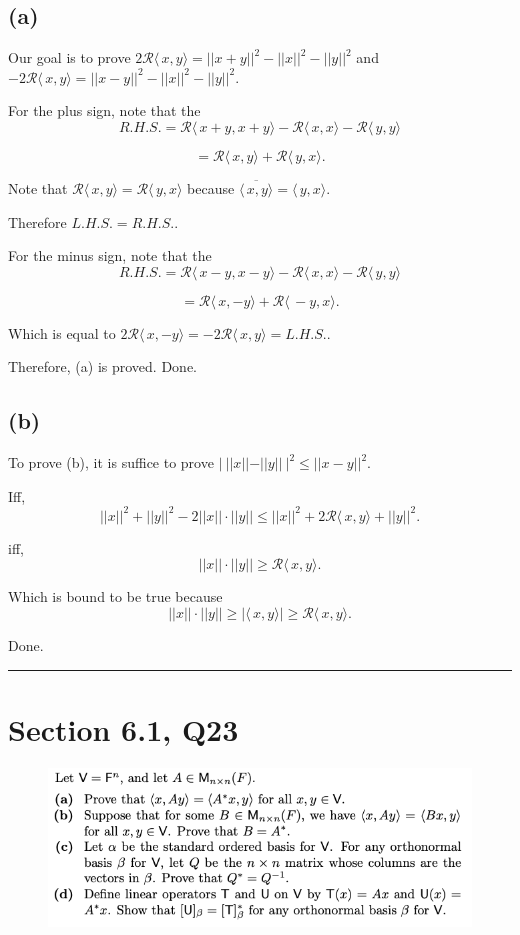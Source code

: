 \documentclass[12pt]{article}%
\begin{document}
\subsection{(a)}
Our goal is to prove $ 2\mathcal{R}\langle\,x,y\rangle=||x+ y||^2-||x||^2-||y||^2$ and $ -2\mathcal{R}\langle\,x,y\rangle=||x-y||^2-||x||^2-||y||^2.$

For the plus sign, note that the $$R.H.S.=\mathcal{R}\langle\,x + y,x + y\rangle-\mathcal{R}\langle\,x,x\rangle-\mathcal{R}\langle\,y,y\rangle$$

$$=\mathcal{R}\langle\,x,y\rangle+\mathcal{R}\langle\,y,x\rangle.$$

Note that $\mathcal{R}\langle\,x,y\rangle = \mathcal{R}\langle\,y,x\rangle$ because $\overline{\langle\,x,y\rangle}=\langle\,y,x\rangle.$

Therefore $L.H.S.=R.H.S..$

For the minus sign, note that the $$R.H.S.=\mathcal{R}\langle\,x - y,x - y\rangle-\mathcal{R}\langle\,x,x\rangle-\mathcal{R}\langle\,y,y\rangle$$

$$=\mathcal{R}\langle\,x,-y\rangle+\mathcal{R}\langle\,-y,x\rangle.$$ 

Which is equal to $2\mathcal{R}\langle\,x,-y\rangle=-2\mathcal{R}\langle\,x,y\rangle=L.H.S..$

Therefore, (a) is proved. Done.

\subsection{(b)}
To prove (b), it is suffice to prove $|~||x||-||y||~|^2\leq ||x-y||^2.$

Iff, $$||x||^2+||y||^2-2||x|| \cdot ||y||\leq ||x||^2 + 2\mathcal{R}\langle\,x,y\rangle+||y||^2.$$

iff, $$||x||\cdot ||y||\geq \mathcal{R}\langle\,x,y\rangle.$$

Which is bound to be true because $$||x||\cdot ||y||\geq |\langle\,x,y\rangle|\geq \mathcal{R}\langle\,x,y\rangle.$$

Done.

\noindent\rule[0.1ex]{\linewidth}{1pt}

\section{Section 6.1, Q23}

\begin{figure}[htp]
    \includegraphics[width = 15cm]{img/Q5.png}
\end{figure}
\end{document}
